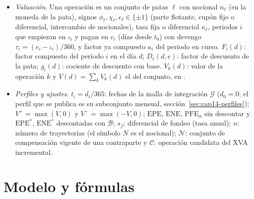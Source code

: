 \begin{itemize}
        del paso (sección~\ref{sec:cap14-paso}).
  \item \emph{Valuación}. Una operación es un conjunto de patas $\ell$ con nocional $n_\ell$ (en la moneda de la
        pata), signos $\phi_\ell,\chi_\ell,\epsilon_\ell\in\{\pm1\}$ (parte flotante, cupón fijo o diferencial,
        intercambio de nocionales), tasa fija o diferencial $\kappa_\ell$, periodos $i$ que empiezan en $\iota_i$ y pagan en
        $e_i$ (días desde $t_0$) con devengo $\tau_i=(e_i-\iota_i)/360$, y factor ya compuesto $a_i$ del periodo en
        curso. $F_i(d)$: factor compuesto del periodo $i$ en el día $d$; $D_\ell(d,e)$: factor de descuento de la
        pata; $g_i(d)$: cociente de descuento con base. $V_k(d)$: valor de la operación $k$ y
        $V(d)=\sum_kV_k(d)$ el del conjunto, en \MXN.
  \item \emph{Perfiles y ajustes}. $t_i=d_i/365$: fechas de la malla de integración $\mathcal G$ ($d_0=0$; el perfil que
        se publica es su subconjunto mensual, sección~\ref{sec:cap14-perfiles}); $V^+=\max(V,0)$ y $V^-=\max(-V,0)$; $\mathrm{EPE}$, $\mathrm{ENE}$, $\mathrm{PFE}_\alpha$ sin
        descontar y $\mathrm{EPE}^*$, $\mathrm{ENE}^*$ descontadas con $\mathcal B$; $s_f$: diferencial de fondeo
        (tasa anual); $n$: número de trayectorias (el símbolo $N$ es el nocional); $\mathcal N$: conjunto de
        compensación vigente de una contraparte y $\mathcal C$: operación candidata del XVA incremental.
\end{itemize}

\section{Modelo y fórmulas}\label{sec:cap14-modelo}


